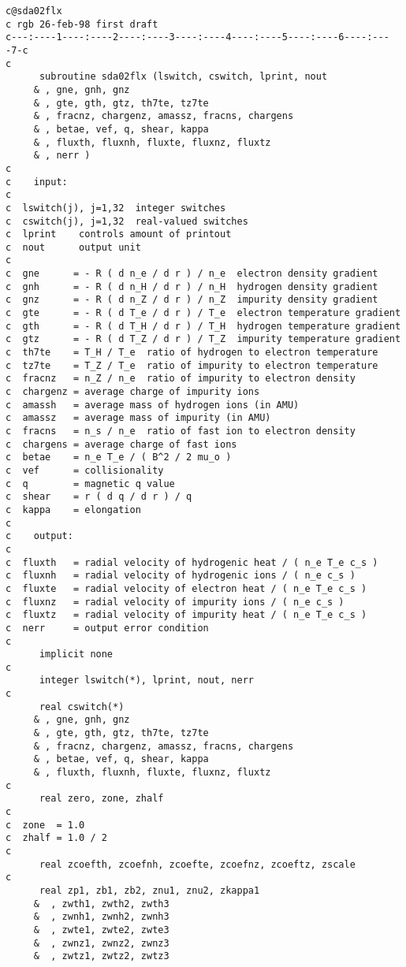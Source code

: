\begin{verbatim}
c@sda02flx
c rgb 26-feb-98 first draft
c---:----1----:----2----:----3----:----4----:----5----:----6----:----7-c
c
      subroutine sda02flx (lswitch, cswitch, lprint, nout
     & , gne, gnh, gnz
     & , gte, gth, gtz, th7te, tz7te
     & , fracnz, chargenz, amassz, fracns, chargens
     & , betae, vef, q, shear, kappa
     & , fluxth, fluxnh, fluxte, fluxnz, fluxtz
     & , nerr )
c
c    input:
c
c  lswitch(j), j=1,32  integer switches
c  cswitch(j), j=1,32  real-valued switches
c  lprint    controls amount of printout
c  nout      output unit
c
c  gne      = - R ( d n_e / d r ) / n_e  electron density gradient
c  gnh      = - R ( d n_H / d r ) / n_H  hydrogen density gradient
c  gnz      = - R ( d n_Z / d r ) / n_Z  impurity density gradient
c  gte      = - R ( d T_e / d r ) / T_e  electron temperature gradient
c  gth      = - R ( d T_H / d r ) / T_H  hydrogen temperature gradient
c  gtz      = - R ( d T_Z / d r ) / T_Z  impurity temperature gradient
c  th7te    = T_H / T_e  ratio of hydrogen to electron temperature
c  tz7te    = T_Z / T_e  ratio of impurity to electron temperature
c  fracnz   = n_Z / n_e  ratio of impurity to electron density
c  chargenz = average charge of impurity ions
c  amassh   = average mass of hydrogen ions (in AMU)
c  amassz   = average mass of impurity (in AMU)
c  fracns   = n_s / n_e  ratio of fast ion to electron density
c  chargens = average charge of fast ions
c  betae    = n_e T_e / ( B^2 / 2 mu_o )
c  vef      = collisionality
c  q        = magnetic q value
c  shear    = r ( d q / d r ) / q
c  kappa    = elongation
c
c    output:
c
c  fluxth   = radial velocity of hydrogenic heat / ( n_e T_e c_s )
c  fluxnh   = radial velocity of hydrogenic ions / ( n_e c_s )
c  fluxte   = radial velocity of electron heat / ( n_e T_e c_s )
c  fluxnz   = radial velocity of impurity ions / ( n_e c_s )
c  fluxtz   = radial velocity of impurity heat / ( n_e T_e c_s )
c  nerr     = output error condition
c
      implicit none
c
      integer lswitch(*), lprint, nout, nerr
c
      real cswitch(*) 
     & , gne, gnh, gnz
     & , gte, gth, gtz, th7te, tz7te
     & , fracnz, chargenz, amassz, fracns, chargens
     & , betae, vef, q, shear, kappa
     & , fluxth, fluxnh, fluxte, fluxnz, fluxtz
c
      real zero, zone, zhalf
c
c  zone  = 1.0
c  zhalf = 1.0 / 2
c
      real zcoefth, zcoefnh, zcoefte, zcoefnz, zcoeftz, zscale
c
      real zp1, zb1, zb2, znu1, znu2, zkappa1
     &  , zwth1, zwth2, zwth3
     &  , zwnh1, zwnh2, zwnh3
     &  , zwte1, zwte2, zwte3
     &  , zwnz1, zwnz2, zwnz3
     &  , zwtz1, zwtz2, zwtz3

\end{verbatim}
